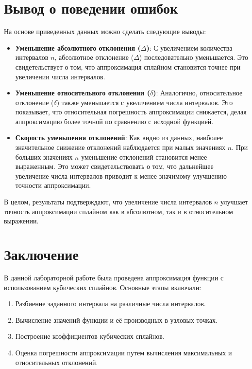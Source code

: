 \documentclass{article}
\begin{document}
\section*{Вывод о поведении ошибок}

На основе приведенных данных можно сделать следующие выводы:

\begin{itemize}
    \item \textbf{Уменьшение абсолютного отклонения (\( \Delta \))}: С увеличением количества интервалов \( n \), абсолютное отклонение (\( \Delta \)) последовательно уменьшается. Это свидетельствует о том, что аппроксимация сплайном становится точнее при увеличении числа интервалов.
    \item \textbf{Уменьшение относительного отклонения (\( \delta \))}: Аналогично, относительное отклонение (\( \delta \)) также уменьшается с увеличением числа интервалов. Это показывает, что относительная погрешность аппроксимации снижается, делая аппроксимацию более точной по сравнению с исходной функцией.
    \item \textbf{Скорость уменьшения отклонений}: Как видно из данных, наиболее значительное снижение отклонений наблюдается при малых значениях \( n \). При больших значениях \( n \) уменьшение отклонений становится менее выраженным. Это может свидетельствовать о том, что дальнейшее увеличение числа интервалов приводит к менее значимому улучшению точности аппроксимации.
\end{itemize}

В целом, результаты подтверждают, что увеличение числа интервалов \( n \) улучшает точность аппроксимации сплайном как в абсолютном, так и в относительном выражении.

\section*{Заключение}


В данной лабораторной работе была проведена аппроксимация функции с использованием кубических сплайнов. Основные этапы включали:
\begin{enumerate}
    \item Разбиение заданного интервала на различные числа интервалов.
    \item Вычисление значений функции и её производных в узловых точках.
    \item Построение коэффициентов кубических сплайнов.
    \item Оценка погрешности аппроксимации путем вычисления максимальных и относительных отклонений.
\end{enumerate}
\end{document}
